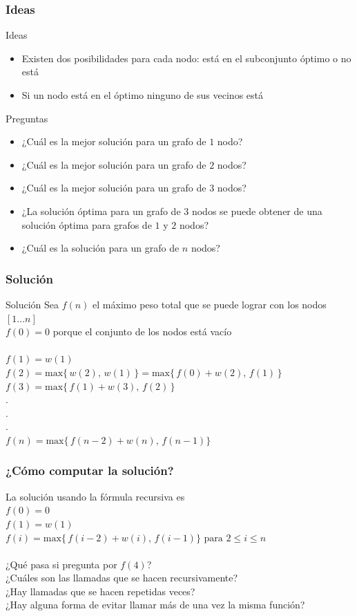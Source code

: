\documentclass{beamer}
\begin{document}
	\begin{frame}
		\frametitle{Ideas}
		\begin{block}{Ideas}
			\begin{itemize}
				\item Existen dos posibilidades para cada nodo: está en el subconjunto óptimo o no está
				\item Si un nodo está en el óptimo ninguno de sus vecinos está 
			\end{itemize}
		\end{block}
		\begin{alertblock}{Preguntas}
			\begin{itemize}
				\item ¿Cuál es la mejor solución para un grafo de $1$ nodo?
				\item ¿Cuál es la mejor solución para un grafo de $2$ nodos?
				\item ¿Cuál es la mejor solución para un grafo de $3$ nodos?\pause
				\item ¿La solución óptima para un grafo de $3$ nodos se puede obtener de una solución óptima para grafos de $1$ y $2$ nodos? \pause
				\item ¿Cuál es la solución para un grafo de $n$ nodos?
			\end{itemize}
		\end{alertblock}
	\end{frame}
	
	\begin{frame}
		\frametitle{Solución}
		\begin{block}{Solución}
			Sea $f(n)$ el máximo peso total que se puede lograr con los nodos $[1 \ldots n]$\\
			$f(0) = 0$ porque el conjunto de los nodos está vacío\\ \quad \\
			$f(1) = w(1)$\\
			$f(2) = \text{max}\{\,w(2),\, w(1)\,\} = \text{max}\{\,f(0) + w(2),\, f(1)\,\}$
			$f(3) = \text{max}\{\,f(1) + w(3),\, f(2)\,\}$\\
			.\\
			.\\
			.\\
			$f(n) = \text{max}\{\,f(n-2) + w(n),\, f(n-1)\}$
		\end{block}
	\end{frame}
	
	\begin{frame}
		\frametitle{¿Cómo computar la solución?}
		La solución usando la fórmula recursiva es\\
		$f(0) = 0$ \\
		$f(1) = w(1)$\\
		$f(i) = \text{max}\{\,f(i-2) + w(i),\, f(i-1)\} \text{  para } 2 \leq i \leq n$\\ \quad \\
		¿Qué pasa si pregunta por $f(4)$?\\
		¿Cuáles son las llamadas que se hacen recursivamente?\\
		¿Hay llamadas que se hacen repetidas veces?\\
		¿Hay alguna forma de evitar llamar más de una vez la misma función?
	\end{frame}
	
\end{document}
